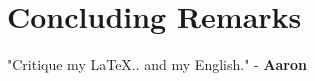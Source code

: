 \setcounter{chapter}{11}
\chapter{Concluding Remarks}
\large
"Critique my \LaTeX.. and my English." - \textbf{Aaron}

